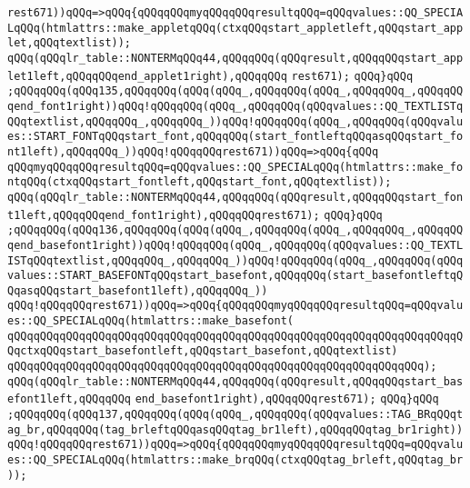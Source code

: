 \verb|rest671))qQQq=>qQQq{qQQqqQQqmyqQQqqQQqresultqQQq=qQQqvalues::QQ_SPECIALqQQq(htmlattrs::make_appletqQQq(ctxqQQqstart_appletleft,qQQqstart_applet,qQQqtextlist));|\newline
\verb|qQQq(qQQqlr_table::NONTERMqQQq44,qQQqqQQq(qQQqresult,qQQqqQQqstart_applet1left,qQQqqQQqend_applet1right),qQQqqQQq|\newline
\verb|rest671);|\newline
\verb|qQQq}qQQq|\newline
\verb|;qQQqqQQq(qQQq135,qQQqqQQq(qQQq(qQQq_,qQQqqQQq(qQQq_,qQQqqQQq_,qQQqqQQqend_font1right))qQQq!qQQqqQQq(qQQq_,qQQqqQQq(qQQqvalues::QQ_TEXTLISTqQQqtextlist,qQQqqQQq_,qQQqqQQq_))qQQq!qQQqqQQq(qQQq_,qQQqqQQq(qQQqvalues::START_FONTqQQqstart_font,qQQqqQQq(start_fontleftqQQqasqQQqstart_font1left),qQQqqQQq_))qQQq!qQQqqQQqrest671))qQQq=>qQQq{qQQq|\newline
\verb|qQQqmyqQQqqQQqresultqQQq=qQQqvalues::QQ_SPECIALqQQq(htmlattrs::make_fontqQQq(ctxqQQqstart_fontleft,qQQqstart_font,qQQqtextlist));|\newline
\verb|qQQq(qQQqlr_table::NONTERMqQQq44,qQQqqQQq(qQQqresult,qQQqqQQqstart_font1left,qQQqqQQqend_font1right),qQQqqQQqrest671);|\newline
\verb|qQQq}qQQq|\newline
\verb|;qQQqqQQq(qQQq136,qQQqqQQq(qQQq(qQQq_,qQQqqQQq(qQQq_,qQQqqQQq_,qQQqqQQqend_basefont1right))qQQq!qQQqqQQq(qQQq_,qQQqqQQq(qQQqvalues::QQ_TEXTLISTqQQqtextlist,qQQqqQQq_,qQQqqQQq_))qQQq!qQQqqQQq(qQQq_,qQQqqQQq(qQQqvalues::START_BASEFONTqQQqstart_basefont,qQQqqQQq(start_basefontleftqQQqasqQQqstart_basefont1left),qQQqqQQq_))|\newline
\verb|qQQq!qQQqqQQqrest671))qQQq=>qQQq{qQQqqQQqmyqQQqqQQqresultqQQq=qQQqvalues::QQ_SPECIALqQQq(htmlattrs::make_basefont(|\newline
\verb|qQQqqQQqqQQqqQQqqQQqqQQqqQQqqQQqqQQqqQQqqQQqqQQqqQQqqQQqqQQqqQQqqQQqqQQqctxqQQqstart_basefontleft,qQQqstart_basefont,qQQqtextlist)|\newline
\verb|qQQqqQQqqQQqqQQqqQQqqQQqqQQqqQQqqQQqqQQqqQQqqQQqqQQqqQQqqQQqqQQq);|\newline
\verb|qQQq(qQQqlr_table::NONTERMqQQq44,qQQqqQQq(qQQqresult,qQQqqQQqstart_basefont1left,qQQqqQQq|\newline
\verb|end_basefont1right),qQQqqQQqrest671);|\newline
\verb|qQQq}qQQq|\newline
\verb|;qQQqqQQq(qQQq137,qQQqqQQq(qQQq(qQQq_,qQQqqQQq(qQQqvalues::TAG_BRqQQqtag_br,qQQqqQQq(tag_brleftqQQqasqQQqtag_br1left),qQQqqQQqtag_br1right))qQQq!qQQqqQQqrest671))qQQq=>qQQq{qQQqqQQqmyqQQqqQQqresultqQQq=qQQqvalues::QQ_SPECIALqQQq(htmlattrs::make_brqQQq(ctxqQQqtag_brleft,qQQqtag_br));|\newline
